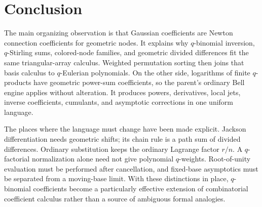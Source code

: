 \documentclass[11pt,a4paper]{article}
\numberwithin{equation}{section}
\theoremstyle{definition}
\theoremstyle{remark}
\begin{document}
\section{Conclusion}
The main organizing observation is that Gaussian coefficients are
Newton connection coefficients for geometric nodes. It explains why
$q$-binomial inversion, $q$-Stirling sums, colored-node families, and
geometric divided differences fit the same triangular-array calculus.
Weighted permutation sorting then joins that basis calculus to
$q$-Eulerian polynomials. On the other side, logarithms of finite
$q$-products have geometric power-sum coefficients, so the parent's
ordinary Bell engine applies without alteration. It produces powers,
derivatives, local jets, inverse coefficients, cumulants, and asymptotic
corrections in one uniform language.

The places where the language must change have been made explicit.
Jackson differentiation needs geometric shifts; its chain rule is a
path sum of divided differences. Ordinary substitution keeps the
ordinary Lagrange factor $r/n$. A $q$-factorial normalization alone
need not give polynomial $q$-weights. Root-of-unity evaluation must be
performed after cancellation, and fixed-base asymptotics must be
separated from a moving-base limit. With these distinctions in place,
$q$-binomial coefficients become a particularly effective extension of
combinatorial coefficient calculus rather than a source of ambiguous
formal analogies.

\clearpage
\appendix
\end{document}
